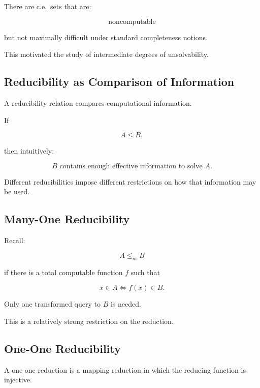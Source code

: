 There are c.e.\ sets that are:

\[
\boxed{
\text{noncomputable}
}
\]

but not maximally difficult under standard completeness notions.

This motivated the study of intermediate degrees of unsolvability.

\subsection{Reducibility as Comparison of Information}
\label{subsec:reducibility-information}

A reducibility relation compares computational information.

If

\[
A\leq B,
\]

then intuitively:

\[
\boxed{
B
\text{ contains enough effective information to solve }A.
}
\]

Different reducibilities impose different restrictions on how that
information may be used.

\subsection{Many-One Reducibility}
\label{subsec:recursion-many-one-reducibility}

Recall:

\[
\boxed{
A\leq_m B
}
\]

if there is a total computable function \(f\) such that

\[
\boxed{
x\in A
\iff
f(x)\in B.
}
\]

Only one transformed query to \(B\) is needed.

This is a relatively strong restriction on the reduction.

\subsection{One-One Reducibility}
\label{subsec:one-one-reducibility}

A one-one reduction is a mapping reduction in which the reducing function
is injective.


